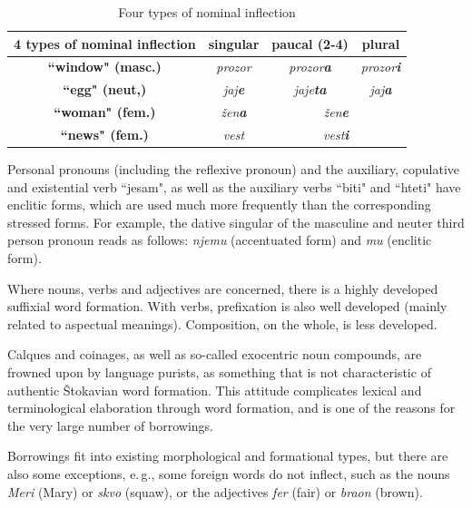 \begin{multicols}{2}
\begin{table}[ht]
\begin{center}
\renewcommand{\arraystretch}{2.2}
\setlength{\arrayrulewidth}{1pt}
\begin{tabular}{|c|c|c|c|}
\hline
{\textbf{4 types of nominal inflection}} & {\textbf{singular}} & {\textbf{paucal (2-4)}} & {\textbf{plural}} \\
\hline
{\textbf{``window" (masc.)}} & \textit{prozor} & \textit{prozor\textbf{a}} & \textit{prozor\textbf{i}} \\
\hline
{\textbf{``egg" (neut,)}} & \textit{jaj\textbf{e}} & \textit{jaje\textbf{ta}} & \textit{jaj\textbf{a}} \\
\hline
{\textbf{``woman" (fem.)}} & \textit{žen\textbf{a}} & \multicolumn{2}{c|}{\textit{žen\textbf{e}}} \\
\hline
{\textbf{``news" (fem.)}} & \textit{vest} &  \multicolumn{2}{c|}{\textit{vest\textbf{i}}} \\
\hline
\end{tabular}
\end{center}
\caption{Four types of nominal inflection}
 \label{nominal_inflection}
\end{table}

Personal pronouns (including the reflexive pronoun) and the auxiliary, copulative and existential verb ``jesam", as well as the auxiliary verbs ``biti" and ``hteti" have enclitic forms, which are used much more frequently than the corresponding stressed forms. For example, the dative singular of the masculine and neuter third person pronoun reads as follows:  \textit{njemu} (accentuated form) and  \textit{mu} (enclitic form).

Where nouns, verbs and adjectives are concerned, there is a highly developed suffixial word formation. With verbs, prefixation is also well developed (mainly related to aspectual meanings). Composition, on the whole, is less developed.

Calques and coinages, as well as so-called exocentric noun compounds, are frowned upon by language purists, as something that is not characteristic of authentic Štokavian word formation. This attitude complicates lexical and terminological elaboration through word formation, and is one of the reasons for the very large number of borrowings.

Borrowings fit into existing morphological and formational types, but there are also some exceptions, e.\,g., some foreign words do not inflect, such as the nouns \textit{Meri}  (Mary) or \textit{skvo} (squaw), or the adjectives \textit{fer} (fair) or \textit{braon} (brown). 


\end{multicols}

